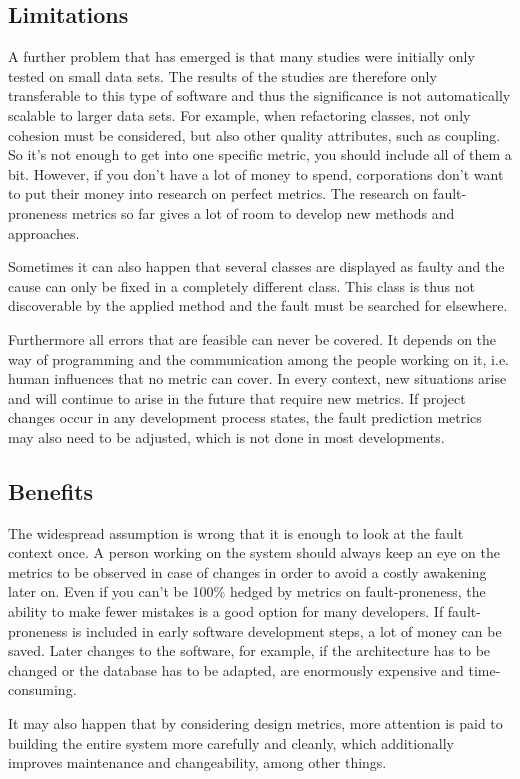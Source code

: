\subsection{Limitations}

A further problem that has emerged is that many studies were initially only tested on small data sets. The results of the studies are therefore only transferable to this type of software and thus the significance is not automatically scalable to larger data sets. For example, when refactoring classes, not only cohesion must be considered, but also other quality attributes, such as coupling. So it's not enough to get into one specific metric, you should include all of them a bit. However, if you don't have a lot of money to spend, corporations don't want to put their money into research on perfect metrics. The research on fault-proneness metrics so far gives a lot of room to develop new methods and approaches.

Sometimes it can also happen that several classes are displayed as faulty and the cause can only be fixed in a completely different class. This class is thus not discoverable by the applied method and the fault must be searched for elsewhere.

Furthermore all errors that are feasible can never be covered. It depends on the way of programming and the communication among the people working on it, i.e. human influences that no metric can cover. In every context, new situations arise and will continue to arise in the future that require new metrics. If project changes occur in any development process states, the fault prediction metrics may also need to be adjusted, which is not done in most developments.

\subsection{Benefits}

The widespread assumption is wrong that it is enough to look at the fault context once. A person working on the system should always keep an eye on the metrics to be observed in case of changes in order to avoid a costly awakening later on.
Even if you can't be 100\% hedged by metrics on fault-proneness, the ability to make fewer mistakes is a good option for many developers. If fault-proneness is included in early software development steps, a lot of money can be saved.
Later changes to the software, for example, if the architecture has to be changed or the database has to be adapted, are enormously expensive and time-consuming.

It may also happen that by considering design metrics, more attention is paid to building the entire system more carefully and cleanly, which additionally improves maintenance and changeability, among other things.